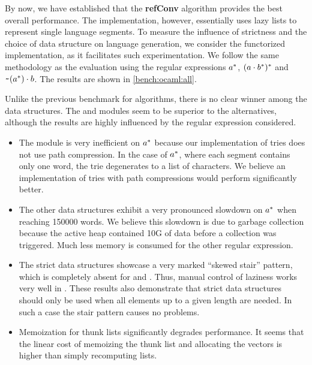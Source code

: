 By now, we have established that the \textbf{refConv} algorithm
provides the best overall performance.  The \haskell implementation,
however, essentially uses lazy lists to represent single language
segments. To measure the influence of strictness and the choice of data structure on
language generation, we consider the functorized \ocaml implementation, as it facilitates such experimentation.
We follow the same methodology as the \haskell evaluation using the
regular expressions $a^*$, $(a \cdot{b^*})^*$ and
$\texttt{\textasciitilde}{(a^*)} \cdot{b}$.  The results are shown in
\cref{bench:ocaml:all}.

Unlike the previous benchmark for algorithms, there is no clear winner
among the data structures. The  and  modules seem to
be superior to the alternatives, although the results are highly influenced by
the regular expression considered.
\begin{itemize}[leftmargin=*]
\item The  module is very inefficient on $a^*$ because
  our implementation of tries does not use path compression.
  In the case of $a^*$, where each segment contains only one word, the
  trie degenerates to a list of characters.
  We believe
  an implementation of tries with path compressions would perform significantly better.
\item The other data structures exhibit a very pronounced slowdown on $a^*$
  when reaching 150000 words.
  We believe this slowdown is due to garbage collection because
  the active heap contained 10G of data before
  a collection was triggered. Much less memory is consumed for the other regular
  expression.
\item The strict data structures showcase a very marked ``skewed
  stair'' pattern, which is completely absent for  and
  . Thus, manual control of laziness works very well in
  \ocaml. These results also demonstrate that strict data structures
  should only be used when all elements up to a given length are
  needed. In such a case the stair pattern causes no problems.
\item Memoization for thunk lists significantly degrades performance. It seems
  that the linear cost of memoizing the thunk list and allocating the vectors
  is higher than simply recomputing lists.
\end{itemize}


